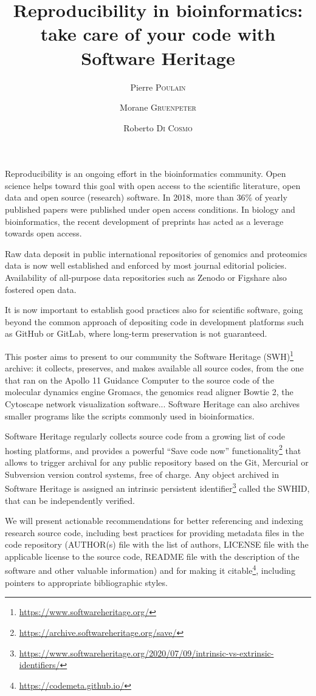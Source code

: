 \documentclass[poster, final]{jobim}
\title{Reproducibility in bioinformatics: take care of your code with Software Heritage}
\author{Pierre \textsc{Poulain}\inst{1} \and Morane \textsc{Gruenpeter}\inst{2} \and Roberto \textsc{Di Cosmo}\inst{3}}
\institute{
	Université de Paris, CNRS, Institut Jacques Monod, F-75006, Paris, France
	\and
	Software Heritage, Inria, France
	\and
	Software Heritage, Inria and University of Paris, France
}
\begin{document}

\maketitle

\setcounter{footnote}{0}

Reproducibility is an ongoing effort in the bioinformatics community\cite{kim2018}. Open science helps toward this goal with open access to the scientific literature, open data and
open source (research) software. In 2018, more than 36\% of yearly published papers were published under open access conditions\cite{trendsopenaccesspublications}. In biology and bioinformatics, the recent development of preprints has acted as a leverage towards open access.

Raw data deposit in public international repositories of genomics and proteomics data is now well established and enforced by most journal editorial policies. Availability of all-purpose data repositories such as Zenodo or Figshare also fostered open data.

It is now important to establish good practices also for scientific software,
going beyond the common approach of depositing code in development platforms
such as GitHub or GitLab, where long-term preservation is not guaranteed.

This poster aims to present to our community the Software Heritage (SWH)\footnote{\url{https://www.softwareheritage.org/}} archive\cite{dicosmo2017}: it collects, preserves, and makes available all source codes, from the one that ran on the Apollo 11 Guidance Computer to the source code of the molecular dynamics engine Gromacs, the genomics read aligner Bowtie 2, the Cytoscape network visualization software... Software Heritage can also archives smaller programs like the scripts commonly used in bioinformatics.

Software Heritage regularly collects source code from a growing list of code
hosting platforms, and provides a powerful “Save code now” functionality\footnote{\url{https://archive.softwareheritage.org/save/}} that allows to trigger archival for any
public repository based on the Git, Mercurial or Subversion version control systems, free of charge. Any object archived in Software Heritage is assigned an intrinsic persistent identifier\footnote{\url{https://www.softwareheritage.org/2020/07/09/intrinsic-vs-extrinsic-identifiers/}} called the SWHID\cite{dicosmo2020},
that can be independently verified.

We will present actionable recommendations for better referencing and indexing research source code, including best practices for providing metadata files in the code repository (AUTHOR(s) file with the list of authors, LICENSE file with the applicable license to the source code, README file with the description of the software and other valuable information) and for making it citable\footnote{\url{https://codemeta.github.io/}}, including pointers to appropriate bibliographic styles\cite{dicosmo2020}.


\printbibliography
 
\end{document}
